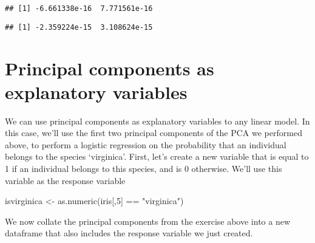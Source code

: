 \documentclass[
]{book}
\newenvironment{Shaded}{\begin{snugshade}}{\end{snugshade}}
\newcommand{\DecValTok}[1]{\textcolor[rgb]{0.00,0.00,0.81}{#1}}
\newcommand{\FunctionTok}[1]{\textcolor[rgb]{0.00,0.00,0.00}{#1}}
\newcommand{\NormalTok}[1]{#1}
\newcommand{\OtherTok}[1]{\textcolor[rgb]{0.56,0.35,0.01}{#1}}
\newcommand{\SpecialCharTok}[1]{\textcolor[rgb]{0.00,0.00,0.00}{#1}}
\newcommand{\StringTok}[1]{\textcolor[rgb]{0.31,0.60,0.02}{#1}}
\begin{document}
\begin{Shaded}
\end{Shaded}

\begin{verbatim}
## [1] -6.661338e-16  7.771561e-16
\end{verbatim}

\begin{Shaded}
\end{Shaded}

\begin{verbatim}
## [1] -2.359224e-15  3.108624e-15
\end{verbatim}

\hypertarget{principal-components-as-explanatory-variables}{%
\section{Principal components as explanatory variables}\label{principal-components-as-explanatory-variables}}

We can use principal components as explanatory variables to any linear model. In this case, we'll use the first two principal components of the PCA we performed above, to perform a logistic regression on the probability that an individual belongs to the species `virginica'. First, let's create a new variable that is equal to 1 if an individual belongs to this species, and is 0 otherwise. We'll use this variable as the response variable

\begin{Shaded}
\begin{Highlighting}[]
\NormalTok{isvirginica }\OtherTok{\textless{}{-}}  \FunctionTok{as.numeric}\NormalTok{(iris[,}\DecValTok{5}\NormalTok{] }\SpecialCharTok{==} \StringTok{"virginica"}\NormalTok{)}
\end{Highlighting}
\end{Shaded}

We now collate the principal components from the exercise above into a new dataframe that also includes the response variable we just created.
\end{document}
